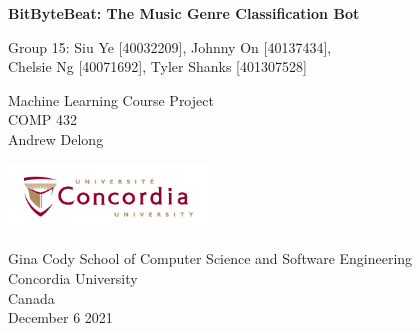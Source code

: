 \begin{titlepage}
   \begin{center}
       \vspace*{1cm}

       \Huge
       \textbf{BitByteBeat: The Music Genre Classification Bot}

        \vspace{0.5cm}
        \Large
        Group 15: Siu Ye [40032209], Johnny On [40137434],\\
        Chelsie Ng [40071692], Tyler Shanks [401307528]
       
       \vspace{6cm}
        Machine Learning Course Project\\
        COMP 432\\
        Andrew Delong

        
       \vspace{1.5cm}
        
        \Large

       \vfill
            
       \vspace{0.8cm}
     
       \includegraphics[width=0.4\textwidth]{images/concologo.png}

       Gina Cody School of Computer Science and Software Engineering\\
       Concordia University\\
       Canada\\
       December 6 2021
            
   \end{center}
\end{titlepage}